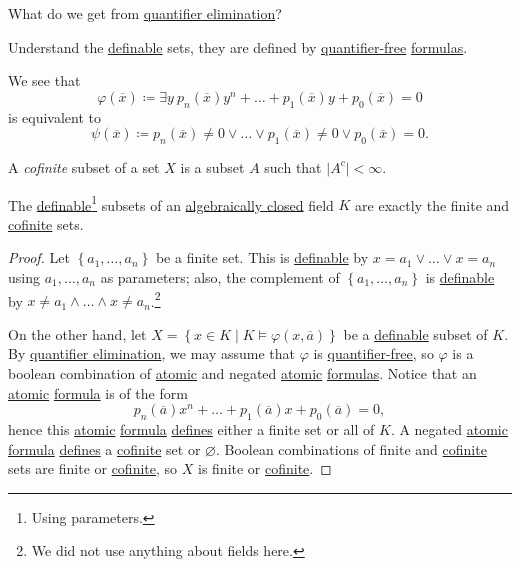 \begin{problem}
What do we get from \hyperref[def:quantifier-elimination]{quantifier elimination}?
\end{problem}
\begin{answer}
	Understand the \hyperref[def:definable]{definable} sets, they are defined by \hyperref[not:quantifier-free]{quantifier-free} \hyperref[def:formula]{formulas}.
\end{answer}

\begin{remark}
	We see that
	\[
		\varphi (\overline{x} ) \coloneqq \exists y\ p_n(\overline{x} ) y^n + \dots + p_1(\overline{x} )y + p_0(\overline{x} ) = 0
	\]
	is equivalent to
	\[
		\psi (\overline{x} ) \coloneqq p_n(\overline{x} ) \neq 0 \lor \dots \lor p_1(\overline{x} ) \neq 0 \lor p_0(\overline{x} ) = 0.
	\]
\end{remark}

\begin{definition}[Cofinite]\label{def:cofinite}
	A \emph{cofinite} subset of a set \(X\) is a subset \(A\) such that \(\vert A^{c} \vert < \infty \).
\end{definition}

\begin{proposition}\label{prop:lec18}
	The \hyperref[def:definable]{definable}\footnote{Using parameters.} subsets of an \hyperref[def:algebraically-closed]{algebraically closed} field \(K\) are exactly the finite and \hyperref[def:cofinite]{cofinite} sets.
\end{proposition}
\begin{proof}
	Let \(\left\{ a_1, \dots , a_n \right\} \) be a finite set. This is \hyperref[def:definable]{definable} by \(x=a_1 \lor \dots \lor x=a_n\) using \(a_1, \dots , a_n\) as parameters; also, the complement of \(\left\{ a_1, \dots , a_n  \right\} \) is \hyperref[def:definable]{definable} by \(x \neq a_1 \land \dots \land x\neq a_n\).\footnote{We did not use anything about fields here.}

	On the other hand, let \(X=\left\{ x\in K \mid K \models \varphi (x, \overline{a} ) \right\} \) be a \hyperref[def:definable]{definable} subset of \(K\). By \hyperref[def:quantifier-elimination]{quantifier elimination}, we may assume that \(\varphi \) is \hyperref[not:quantifier-free]{quantifier-free}, so \(\varphi \) is a boolean combination of \hyperref[not:atomic]{atomic} and negated \hyperref[not:atomic]{atomic} \hyperref[def:formula]{formulas}. Notice that an \hyperref[not:atomic]{atomic} \hyperref[def:formula]{formula} is of the form
	\[
		p_n(\overline{a} ) x^n + \dots + p_1(\overline{a} ) x + p_0(\overline{a} ) = 0,
	\]
	hence this \hyperref[not:atomic]{atomic} \hyperref[def:formula]{formula} \hyperref[def:definable]{defines} either a finite set or all of \(K\). A negated \hyperref[not:atomic]{atomic} \hyperref[def:formula]{formula} \hyperref[def:definable]{defines} a \hyperref[def:cofinite]{cofinite} set or \(\varnothing \). Boolean combinations of finite and \hyperref[def:cofinite]{cofinite} sets are finite or \hyperref[def:cofinite]{cofinite}, so \(X\) is finite or \hyperref[def:cofinite]{cofinite}.
\end{proof}

